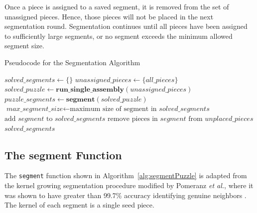 Once a piece is assigned to a saved segment, it is removed from the set of unassigned pieces.  Hence, those pieces will not be placed in the next segmentation round.  Segmentation continues until all pieces have been assigned to sufficiently large segments, or no segment exceeds the minimum allowed segment size.

\begin{algorithm}
\caption{Pseudocode for the Segmentation Algorithm}\label{alg:segmentation}
\begin{algorithmic}[1]
    \State $\textit{solved\_segments} \gets \{ \}$
    \State $\textit{unassigned\_pieces} \gets \{ \textit{all\_pieces} \}$
    \Repeat
        \State $\textit{solved\_puzzle} \gets \textbf{run\_single\_assembly}(\textit{unassigned\_pieces})$
        \State $\textit{puzzle\_segments} \gets \textbf{segment}(\textit{solved\_puzzle})$
        \State $\textit{max\_segment\_size} \gets \text{maximum size of segment in } \textit{solved\_segments}$
                \State $\text{add } \textit{segment} \text{ to } \textit{solved\_segments}$
                \State $\text{remove pieces in } \textit{segment} \text{ from } \textit{unplaced\_pieces}$
            \EndIf
        \EndFor
    \State \Return $\textit{solved\_segments}$
\EndFunction
\end{algorithmic}
\end{algorithm}

\subsection{The segment Function}\label{sec:segmentPuzzle}

The \texttt{segment} function shown in Algorithm~\ref{alg:segmentPuzzle} is adapted from the kernel growing segmentation procedure modified by Pomeranz \textit{et al.}, where it was shown to have greater than 99.7\% accuracy identifying genuine neighbors \cite{pomeranz2011}. The kernel of each segment is a single seed piece.

